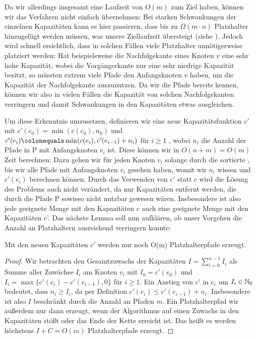 Da wir allerdings insgesamt eine Laufzeit von $O(m)$ zum Ziel haben, können wir das  Verfahren
nicht einfach übernehmen:
Bei starken Schwankungen der einzelnen Kapazitäten kann es hier passieren, dass bis zu $\Omega(m\cdot n)$
Platzhalter hinzugefügt werden müssen, was unsere Ziellaufzeit übersteigt (siehe ).
Jedoch wird schnell ersichtlich, dass in solchen Fällen viele Platzhalter unnötigerweise platziert werden:
Hat beispielsweise die Nachfolgekante eines Knoten $v$ eine sehr hohe Kapazität, wobei die Vorgängerkante nur eine sehr
niedrige Kapazität besitzt, so müssten extrem viele Pfade den Anfangsknoten $v$ haben, um die Kapazität der
Nachfolgekante auszunutzen.
Da wir die Pfade bereits kennen, können wir also in vielen Fällen die Kapazität von solchen Nachfolgekanten verringern und
damit Schwankungen in den Kapazitäten etwas ausgleichen.

Um diese Erkenntnis umzusetzen, definieren wir eine neue Kapazitätsfunktion $c'$ mit $c'(e_0) = \min(c(e_0), n_0)$ und
$ c'(e_i) \colonequals \min(c(e_i), c'(e_{i-1}) + n_i)$ für $i \geq 1$ , wobei $n_i$ die Anzahl der Pfade in P mit
Anfangsknoten $v_i$ ist.
Diese können wir in $O(n + m) = O(m)$ Zeit berechnen: Dazu gehen wir für jeden Knoten $v_i$ solange durch die sortierte
, bis wir alle Pfade mit Anfangsknoten $v_i$ gesehen haben, womit wir
$n_i$ wissen und $c'(e_i)$ berechnen können.
Durch das Verwenden von $c'$ statt $c$ wird die Lösung des Problems auch nicht verändert, da nur Kapazitäten entfernt
werden, die durch die Pfade P sowieso nicht nutzbar gewesen wären. Insbesondere ist also jede geeignete Menge mit den
Kapazitäten c auch eine geeignete Menge mit den Kapazitäten c'.
Das nächste Lemma soll nun aufklären, ob unser Vorgehen die Anzahl an Platzhaltern ausreichend verringern konnte:

\begin{lemma}
    Mit den neuen Kapazitäten $c'$ werden nur noch O(m) Platzhalterpfade erzeugt.
\end{lemma}
\begin{proof}
    Wir betrachten den Gesamtzuwachs der Kapazitäten $I = \sum_{i = 0}^{n-1} I_i$ als Summe aller Zuwächse $I_i$ am
    Knoten $v_i$ mit $I_0 = c'(e_0)$ und $I_i = \max\{c'(e_i) - c'(e_{i-1}), 0\}$ für $i \geq 1$.
    Ein Anstieg von $c'$ in $e_i$ um $I_i \in \mathbb N_0$ bedeutet, dass $n_i \geq I_i$, da per Definition
    $c'(e_i) \leq c'(e_{i-1}) + n_i$.
    Insbesondere ist also $I$ beschränkt durch die Anzahl an Pfaden $m$.
    Ein Platzhalterpfad wir außerdem nur dann erzeugt, wenn der Algorithmus auf einen Zuwachs in den Kapazitäten stößt
    oder das Ende der Kette erreicht ist.
    Das heißt es werden höchstens $I + C = O(m)$ Platzhalterpfade erzeugt.
\end{proof}

